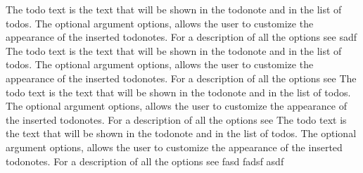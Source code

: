 










\frontmatter                    				%
\cleardoublepage					%
\cleardoublepage					%

\tableofcontents					%
\listoffigures						%

\listoftodos						%
	
\mainmatter                     %



\appendix

The todo text 
is the text that will be shown in the todonote and in the
list of todos. The optional argument options, allows the user to customize the
appearance of the inserted todonotes. For a description of all the options see
sadf
The todo text is the text that will be shown in the todonote and in the
list of todos. The optional argument options, allows the user to customize the
appearance of the inserted todonotes. For a description of all the options see
The todo text is the text that will be shown in the todonote and in the
list of todos. The optional argument options, allows the user to customize the
appearance of the inserted todonotes. For a description of all the options see
The todo text is the text that will be shown in the todonote and in the
list of todos. The optional argument options, allows the user to customize the
appearance of the inserted todonotes. For a description of all the options see
fasd
fadsf
asdf

\printbibliography  %


